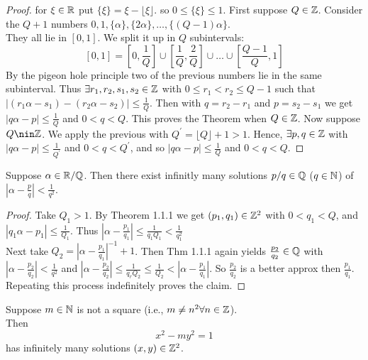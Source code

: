 \documentclass[NumTh.tex]{subfiles}
\begin{document}
\begin{proof}
  for $\xi \in \mathbb{R}$ put $\{ \xi \} = \xi - \lfloor \xi \rfloor$. so $ 0 \leq \{ \xi\} \leq 1$. First suppose $Q \in \mathbb{Z}$.
  Consider the $Q + 1$ numbers $0,1,\{\alpha\},\{2\alpha\},\dots,\{(Q-1)\alpha\}$.\\
  They all lie in $[0,1]$. We split it up in $Q$ subintervals:
  \[ [0,1] =[0, \frac{1}{Q}] \cup \left[ \frac{1}{Q},\frac{2}{Q} \right] \cup \dots \cup \left[ \frac{Q-1}{Q},1 \right] \]
  By the pigeon hole principle two of the previous numbers lie in the same subinterval. Thus $\exists r_1,r_2,s_1,s_2 \in \mathbb{Z}$ with $0 \leq r_1 < r_2 \leq Q-1$ such that $| (r_1\alpha - s_1) - (r_2 \alpha -s_2) | \leq \frac{1}{Q}$.
  Then with $q = r_2 - r_1$ and $p = s_2 -s_1$ we get $|q\alpha - p| \leq \frac{1}{Q}$ and $0 < q < Q$.
  This proves the Theorem when $Q \in \mathbb{Z}$. Now suppose $Q \nin \Z$. 
  We apply the previous with $Q^\prime = \lfloor Q \rfloor + 1 > 1$.
  Hence, $\exists p,q \in \mathbb{Z}$ with $| q\alpha - p | \leq \frac{1}{Q^\prime}$ and $0 < q < Q^\prime$, and so $|q\alpha - p | \leq \frac{1}{Q}$ and $0 < q < Q$.
\end{proof}

\begin{cor}
  Suppose $\alpha \in \mathbb{R}/\mathbb{Q}$. Then there exist infinitly many solutions $p/q \in \mathbb{Q}$ ($q \in \mathbb{N}$) of $| \alpha - \frac{p}{q}| < \frac{1}{q^2}$.
\end{cor}

\begin{proof}
  Take $Q_1 > 1$. By Theorem 1.1.1 we get $(p_1, q_1) \in \mathbb{Z}^2$ with $0<q_1 < Q$, and $|q_1 \alpha - p_1 | \leq \frac{1}{Q_1}$.
  Thus $|\alpha - \frac{p_1}{q_1} | \leq \frac{1}{q_1 Q_1} < \frac{1}{q_1^2}$
  \\
  Next take $Q_2 = |\alpha - \frac{p_1}{q_1}|^{-1} + 1$. Then Thm 1.1.1 again yields $\frac{p_2}{q_2} \in \mathbb{Q}$ with $|\alpha - \frac{p_2}{q_2} | < \frac{1}{q^2}$ and $|\alpha - \frac{p_2}{q_2} | \leq \frac{1}{q_r Q_2} \leq \frac{1}{Q_2} < |\alpha - \frac{p_1}{q_1}|$. So $\frac{p_2}{q_2}$ is a better approx then $\frac{p_1}{q_1}$.
  Repeating this process indefinitely proves the claim.
\end{proof}

\begin{theorem}
  Suppose $m \in \mathbb{N}$ is not a square (i.e., $m \neq n^2 \forall n \in \mathbb{Z}$).\\
  Then 
  \[x^2 - m y^2 = 1\]
  has infinitely many solutions $(x,y)\in \mathbb{Z}^2$.
\end{theorem}
\end{document}
